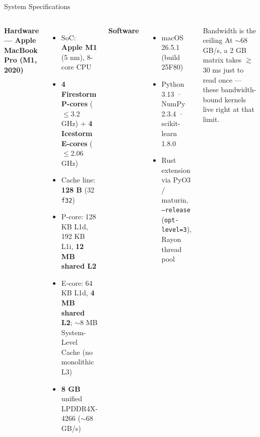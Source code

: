 \documentclass[aspectratio=169]{beamer}
\begin{document}
\begin{frame}{System Specifications}
  \begin{columns}[T]
    \textbf{Hardware — Apple MacBook Pro (M1, 2020)}
    \begin{itemize}
      \item SoC: \textbf{Apple M1} (5 nm), 8-core CPU
      \item \textbf{4 Firestorm P-cores} ($\leq$3.2 GHz) +
            \textbf{4 Icestorm E-cores} ($\leq$2.06 GHz)
      \item Cache line: \textbf{128 B} (32 \texttt{f32})
      \item P-core: 128 KB L1d, 192 KB L1i, \textbf{12 MB shared L2}
      \item E-core: 64 KB L1d, \textbf{4 MB shared L2}; $\sim$8 MB System-Level
            Cache (no monolithic L3)
      \item \textbf{8 GB} unified LPDDR4X-4266 ($\sim$68 GB/s)
    \end{itemize}
    \textbf{Software}
    \begin{itemize}
      \item macOS 26.5.1 (build 25F80)
      \item Python 3.13 · NumPy 2.3.4 · scikit-learn 1.8.0
      \item Rust extension via PyO3 / maturin, \texttt{--release}
            (\texttt{opt-level=3}), Rayon thread pool
    \end{itemize}
    \vspace{0.3em}
    \begin{alertblock}{Bandwidth is the ceiling}
      At $\sim$68 GB/s, a 2 GB matrix takes $\gtrsim$30 ms just to read once ---
      these bandwidth-bound kernels live right at that limit.
    \end{alertblock}
  \end{columns}
\end{frame}
\end{document}
